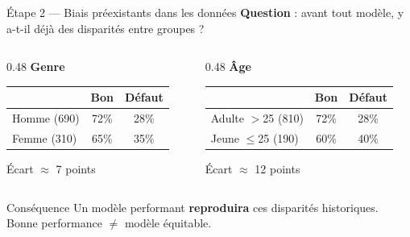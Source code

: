 \documentclass[aspectratio=169, 11pt]{beamer}
\begin{document}
\begin{frame}{\'Etape 2 --- Biais pr\'eexistants dans les donn\'ees}
\textbf{Question} : avant tout mod\`ele, y a-t-il d\'ej\`a des disparit\'es entre groupes ?

\vspace{0.5em}
\begin{columns}[T]
\begin{column}{0.48\textwidth}
\centering\textbf{\textcolor{accent}{Genre}}

\small
\begin{tabular}{lcc}
\toprule
& \textbf{Bon} & \textbf{D\'efaut} \\
\midrule
Homme (690) & 72\% & 28\% \\
Femme (310) & 65\% & 35\% \\
\bottomrule
\end{tabular}

\vspace{0.3em}
\scriptsize \'Ecart $\approx$ 7 points
\end{column}
\begin{column}{0.48\textwidth}
\centering\textbf{\textcolor{fair}{\^Age}}

\small
\begin{tabular}{lcc}
\toprule
& \textbf{Bon} & \textbf{D\'efaut} \\
\midrule
Adulte $>$25 (810) & 72\% & 28\% \\
Jeune $\leq$25 (190) & 60\% & 40\% \\
\bottomrule
\end{tabular}

\vspace{0.3em}
\scriptsize \'Ecart $\approx$ 12 points
\end{column}
\end{columns}

\vspace{0.8em}
\begin{alertblock}{Cons\'equence}
Un mod\`ele performant \textbf{reproduira} ces disparit\'es historiques.
Bonne performance $\neq$ mod\`ele \'equitable.
\end{alertblock}
\end{frame}
\end{document}
